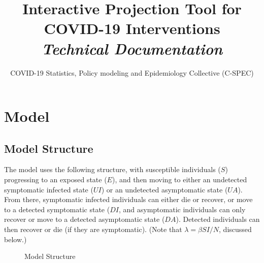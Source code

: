 \documentclass[12pt]{article}
\begin{document}
\title{Interactive Projection Tool for COVID-19 Interventions \\ \emph{Technical Documentation}}
\author{COVID-19 Statistics, Policy modeling and Epidemiology Collective (C-SPEC)}
\date{}
\maketitle

\section{Model}

\subsection{Model Structure}

The model uses the following structure, with susceptible individuals (\(S\)) progressing to an exposed state (\(E\)), and then moving to either an undetected symptomatic infected state (\(UI\)) or an undetected asymptomatic state (\(UA\)). From there, symptomatic infected individuals can either die or recover, or move to a detected symptomatic state (\(DI\), and asymptomatic individuals can only recover or move to a detected asymptomatic state (\(DA\)). Detected individuals can then recover or die (if they are symptomatic). (Note that \(\lambda=\beta S I/N\), discussed below.)

\begin{figure}[H]
\centering
{}
    \caption{Model Structure}
    \label{fig:model}
\end{figure}
\end{document}
